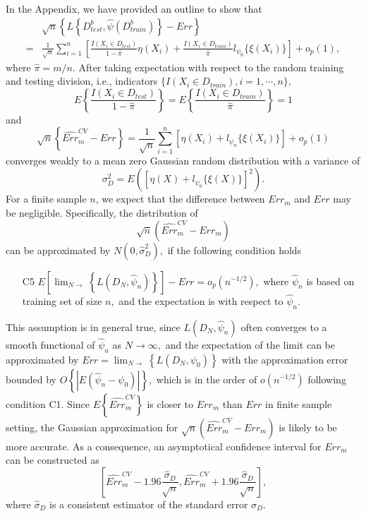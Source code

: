\documentclass[12pt]{article}
\begin{document}
In the Appendix, we have provided an outline to show that 
\begin{align*}
   &\sqrt{n}\left\{L\left\{D_{test}^b, \hat{\psi}(D_{train}^b)\right\}-Err\right\}\\
  =&\frac{1}{\sqrt{n}}\sum_{i=1}^n \left[\frac{I(X_i\in D_{test})}{1-\hat{\pi}}\eta(X_i)+\frac{I(X_i\in D_{train})}{\hat{\pi}}l_{\psi_0}\{\xi(X_i)\} \right] + o_p(1),
\end{align*}
where $\hat{\pi}=m/n.$   After taking expectation with respect to the random training and testing division, i.e., indicators $\{I(X_i \in D_{train}), i=1, \cdots, n\},$
$$ E\left\{\frac{I(X_i\in D_{test})}{1-\hat{\pi}}\right\}=E\left\{\frac{I(X_i\in D_{train})}{\hat{\pi}}\right\}=1$$
and
$$\sqrt{n}\left\{\widehat{Err}^{CV}_m-Err\right\}=\frac{1}{\sqrt{n}}\sum_{i=1}^n \left[\eta(X_i)+l_{\psi_n}\{\xi(X_i)\} \right]+o_p(1)$$
converges weakly to a mean zero Gaussian random distribution with a variance of 
$$\sigma_D^2= E\left(\left[\eta(X)+l_{\psi_0}\{\xi(X)\} \right]^2\right).$$
For a finite sample $n$, we expect that the difference between $Err_m$ and $Err$ may be negligible. Specifically, the distribution of
$$\sqrt{n}\left(\widehat{Err}^{CV}_m-Err_m\right)$$ 
can be approximated by $N(0, \hat{\sigma}_D^2),$ if the following condition holds
\begin{enumerate}
\item[C5] $E \left[\lim_{N\rightarrow}\left\{L(D_N, \widehat{\psi}_n)\right\}\right]-Err=o_p(n^{-1/2}),$ where $\widehat{\psi}_n$ is based on training set of size $n,$ and the expectation is with respect to $\widehat{\psi}_n.$
\end{enumerate}
This assumption is in general true, since $L(D_N, \widehat{\psi}_n)$ often converges to a smooth functional of $\widehat{\psi}_n$ as $N\rightarrow \infty,$ and the expectation of the limit can be approximated by $Err=\lim_{N\rightarrow}\left\{L(D_N, \psi_0)\right\}$ with the approximation error bounded by $O\left\{|E(\widehat{\psi}_n-\psi_0)|\right\},$ which is in the order of $o(n^{-1/2})$ following condition C1. Since $E\left\{\widehat{Err}^{CV}_m\right\}$ is closer to $Err_m$ than $Err$ in finite sample setting, the Gaussian approximation for $\sqrt{n}\left(\widehat{Err}^{CV}_m-Err_m\right)$ is likely to be more accurate. As a consequence, 
an asymptotical confidence interval for $Err_m$ can be constructed as 
$$ \left[\widehat{Err}^{CV}_m-1.96 \frac{\hat{\sigma}_D}{\sqrt{n}},  \widehat{Err}^{CV}_m+1.96 \frac{\hat{\sigma}_D}{\sqrt{n}} \right],$$
where $\hat{\sigma}_D$ is a consistent estimator of the standard error $\sigma_D.$
\end{document}
